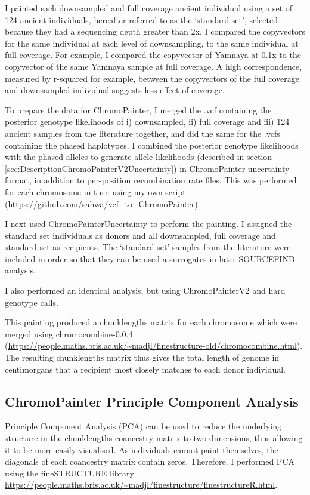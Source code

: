 I painted each downsampled and full coverage ancient individual using a set of 124 ancient individuals, hereafter referred to as the `standard set', selected because they had a sequencing depth greater than 2x. I compared the copyvectors for the same individual at each level of downsampling, to the same individual at full coverage. For example, I compared the copyvector of Yamnaya at 0.1x to the copyvector of the same Yamnaya sample at full coverage. A high correspondence, measured by r-squared for example, between the copyvectors of the full coverage and downsampled individual suggests less effect of coverage. 

To prepare the data for ChromoPainter, I merged the .vcf containing the posterior genotype likelihoods of i) downsampled, ii) full coverage and iii) 124 ancient samples from the literature together, and did the same for the .vcfs containing the phased haplotypes.  I combined the posterior genotype likelihoods with the phased alleles to generate allele likelihoods (described in section \ref{sec:DescriptionChromoPainterV2Uncertainty}) in ChromoPainter-uncertainty format, in addition to per-position recombination rate files. This was performed for each chromosome in turn using my own script (\url{https://github.com/sahwa/vcf_to_ChromoPainter}).

I next used ChromoPainterUncertainty to perform the painting. I assigned the standard set individuals as donors and all downsampled, full coverage and standard set as recipients. The `standard set' samples from the literature were included in order so that they can be used a surrogates in later SOURCEFIND analysis.

I also performed an identical analysis, but using ChromoPainterV2 and hard genotype calls. 

This painting produced a chunklengths matrix for each chromosome which were merged using chromocombine-0.0.4 (\url{https://people.maths.bris.ac.uk/~madjl/finestructure-old/chromocombine.html}). The resulting chunklengths matrix thus gives the total length of genome in centimorgans that a recipient most closely matches to each donor individual. 

\subsection{ChromoPainter Principle Component Analysis}

Principle Component Analysis (PCA) can be used to reduce the underlying structure in the chunklengths coancestry matrix to two dimensions, thus allowing it to be more easily visualised. As individuals cannot paint themselves, the diagonals of each coancestry matrix contain zeros. Therefore, I performed PCA using the fineSTRUCTURE library \url{https://people.maths.bris.ac.uk/~madjl/finestructure/finestructureR.html}.


